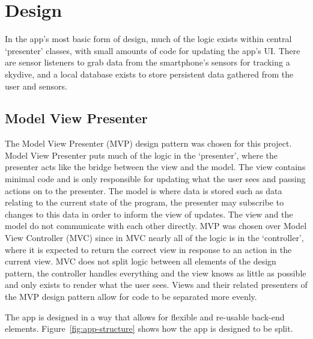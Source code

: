 \section{Design}\label{sec:design} %

In the app's most basic form of design, much of the logic exists within central `presenter' classes, with small amounts of code for updating the app's UI\@. There are sensor listeners to grab data from the smartphone's sensors for tracking a skydive, and a local database exists to store persistent data gathered from the user and sensors.

\subsection{Model View Presenter}
The Model View Presenter (MVP) design pattern was chosen for this project. Model View Presenter puts much of the logic in the `presenter', where the presenter acts like the bridge between the view and the model. The view contains minimal code and is only responsible for updating what the user sees and passing actions on to the presenter. The model is where data is stored such as data relating to the current state of the program, the presenter may subscribe to changes to this data in order to inform the view of updates. The view and the model do not communicate with each other directly. MVP was chosen over Model View Controller (MVC) since in MVC nearly all of the logic is in the `controller', where it is expected to return the correct view in response to an action in the current view. MVC does not split logic between all elements of the design pattern, the controller handles everything and the view knows as little as possible and only exists to render what the user sees. Views and their related presenters of the MVP design pattern allow for code to be separated more evenly.

The app is designed in a way that allows for flexible and re-usable back-end elements. Figure~\vref{fig:app-structure} shows how the app is designed to be split.


